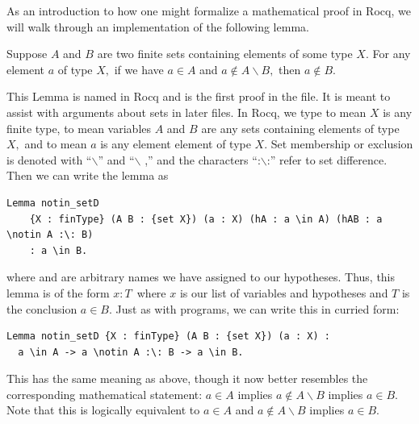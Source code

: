 As an introduction to how one might formalize a mathematical proof in Rocq, we will walk through an implementation of the following lemma. 
\begin{lemma}\label{example}
    Suppose $A$ and $B$ are two finite sets containing elements of some type $X.$ For any element $a$ of type $X,$ if we have $a \in A$ and $a \notin A \backslash B,$ then $a \notin B.$
\end{lemma}
This Lemma is named  in Rocq and is the first proof in the  file. It is meant to assist with arguments about sets in later files. In Rocq, we type  to mean $X$ is any finite type,  to mean variables $A$ and $B$ are any sets containing elements of type $X,$ and  to mean $a$ is any element element of type $X.$ Set membership or exclusion is denoted with ``$\backslash $'' and ``$\backslash$ ,'' and the characters ``:$\backslash$:'' refer to set difference. Then we can write the lemma as
\begin{verbatim}
Lemma notin_setD 
    {X : finType} (A B : {set X}) (a : X) (hA : a \in A) (hAB : a \notin A :\: B)
    : a \in B.
\end{verbatim}
where  and  are arbitrary names we have assigned to our hypotheses. Thus, this lemma is of the form $x : T\,$ where $x$ is our list of variables and hypotheses and $T$ is the conclusion $a \in B.$ Just as with programs, we can write this in curried form:
\begin{verbatim}
Lemma notin_setD {X : finType} (A B : {set X}) (a : X) :
  a \in A -> a \notin A :\: B -> a \in B.
\end{verbatim}
This has the same meaning as above, though it now better resembles the corresponding mathematical statement: $a \in A$ implies $a \notin A \backslash B$ implies $a \in B.$ Note that this is logically equivalent to $a\in A$ and $a \notin A \backslash B$ implies $a \in B.$

